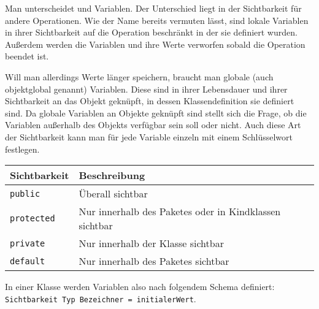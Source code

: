 \begin{Infobox}[Sichtbarkeit]
  Man unterscheidet  und  Variablen.
  Der Unterschied liegt in der Sichtbarkeit für andere Operationen.
  Wie der Name bereits vermuten lässt, sind lokale Variablen in ihrer Sichtbarkeit auf die Operation beschränkt in der sie definiert wurden.
  Außerdem werden die Variablen und ihre Werte verworfen sobald die Operation beendet ist.

  Will man allerdings Werte länger speichern, braucht man globale (auch objektglobal genannt) Variablen.
  Diese sind in ihrer Lebensdauer und ihrer Sichtbarkeit an das Objekt geknüpft, in dessen Klassendefinition sie definiert sind.
  Da globale Variablen an Objekte geknüpft sind stellt sich die Frage, ob die Variablen außerhalb des Objekts verfügbar sein soll oder nicht.
  Auch diese Art der Sichtbarkeit kann man für jede Variable einzeln mit einem Schlüsselwort festlegen.
  
  \begin{center}
    \begin{tabular}{|l|l|}
      \hline
      \textbf{Sichtbarkeit} & \textbf{Beschreibung} \\
      \hline
      \texttt{public} & Überall sichtbar \\
      \hline
      \texttt{protected} & Nur innerhalb des Paketes oder in Kindklassen sichtbar \\
      \hline
      \texttt{private} & Nur innerhalb der Klasse sichtbar \\
      \hline
      \texttt{default} & Nur innerhalb des Paketes sichtbar \\
      \hline
    \end{tabular}
  \end{center}
  
  In einer Klasse werden Variablen also nach folgendem Schema definiert: \lstinline|Sichtbarkeit Typ Bezeichner = initialerWert|.
\end{Infobox}

